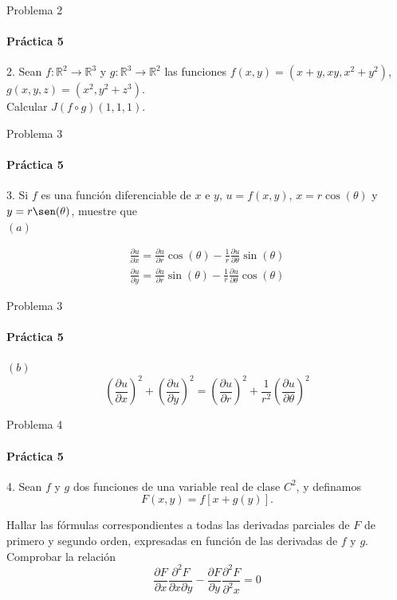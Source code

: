 \documentclass{plantillaPPT}
\begin{document}
\begin{frame}{Problema 2}
\framesubtitle{Práctica 5}

2. Sean \(f:\mathbb{R}^2\to\mathbb{R}^3\) y \(g:\mathbb{R}^3\to\mathbb{R}^2\) las funciones \(f(x,y) = (x+y, xy, x^2+y^2)\), \(g(x,y,z)=(x^2, y^2+z^3)\). \\[5pt]
Calcular \(J(f\circ g)(1,1,1)\).
    
\end{frame}

\begin{frame}{Problema 3}
\framesubtitle{Práctica 5}

3. Si \(f\) es una función diferenciable de \(x\) e \(y\), \(u=f(x,y)\), \(x=r\cos(\theta)\) y \(y=r\sen(\theta)\), muestre que\\
\((a)\)

\begin{align*}
    \frac{\partial u}{\partial x}=\frac{\partial u}{\partial r}\cos(\theta)-\frac{1}{r}\frac{\partial u}{\partial \theta}\sin(\theta)\\[10pt]
    \frac{\partial u}{\partial y}=\frac{\partial u}{\partial r}\sin(\theta)-\frac{1}{r}\frac{\partial u}{\partial \theta}\cos(\theta)
\end{align*}

\end{frame}

\begin{frame}{Problema 3}
\framesubtitle{Práctica 5}
\((b)\)
\[
\left(\frac{\partial u}{\partial x}\right)^2+\left(\frac{\partial u}{\partial y}\right)^2 = \left(\frac{\partial u}{\partial r}\right)^2+\frac{1}{r^2}\left(\frac{\partial u}{\partial \theta}\right)^2
\]
    
\end{frame}

\begin{frame}{Problema 4}
\framesubtitle{Práctica 5}

4. Sean \(f\) y  \(g\) dos funciones de una variable real de clase \(C^2\), y definamos
\[F(x,y) = f[x+g(y)].\]

Hallar las fórmulas correspondientes a todas las derivadas parciales de \(F\) de primero y segundo orden, expresadas en función de las derivadas de \(f\) y \(g\). Comprobar la relación
\[
\frac{\partial F}{\partial x}\frac{\partial^2 F}{\partial x\partial y}-\frac{\partial F}{\partial y}\frac{\partial^2 F}{\partial^2 x}=0
\]
    
\end{frame}
\end{document}
